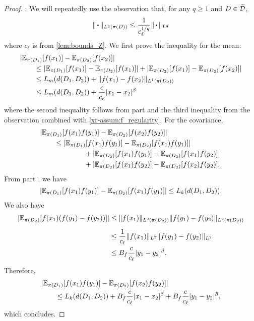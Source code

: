 \documentclass[12pt, twoside]{report}
\newcommand{\xrprefix}[1]{xr-#1}
\begin{document}
\begin{proof}
    :
    We will repeatedly use the observation that, for any $q \ge 1$ and $D \in \widetilde{\mathcal{D}}$,
    \begin{equation}
        \norm{\vardot}_{L^q(\pi(D))} \le \frac{1}{c_\ell^{1/q}} \norm{\vardot}_{L^q}
    \end{equation}
    where $c_\ell$ is from \cref{lem:bounds_Z}.
    We first prove the inequality for the mean:
    \begin{align}
        &\lvert\mathbb{E}_{\pi(D_1)}[f(x_1)] - \mathbb{E}_{\pi(D_2)}[f(x_2)]\rvert \nonumber \\
        &\qquad\le
            \lvert\mathbb{E}_{\pi(D_1)}[f(x_1)] - \mathbb{E}_{\pi(D_2)}[f(x_1)]\rvert
            + \lvert\mathbb{E}_{\pi(D_2)}[f(x_1)] - \mathbb{E}_{\pi(D_2)}[f(x_2)]\rvert \\
        &\qquad\le
            L_m(d(D_1, D_2))
            + \lVert f(x_1) - f(x_2)\rVert_{L^1(\pi(D_2))} \\
        &\qquad\le
            L_m(d(D_1, D_2))
            + \frac{c}{c_\ell} \lvert x_1 - x_2\rvert^\beta
    \end{align}
    where the second inequality follows from part  and the third inequality from the observation combined with \cref{\xrprefix{assum:f_regularity}}.
    For the covariance,
    \begin{align}
        &\lvert\mathbb{E}_{\pi(D_1)}[f(x_1)f(y_1)] - \mathbb{E}_{\pi(D_2)}[f(x_2)f(y_2)]\rvert \nonumber \\
        &\qquad\le
            \lvert\mathbb{E}_{\pi(D_1)}[f(x_1)f(y_1)] - \mathbb{E}_{\pi(D_2)}[f(x_1)f(y_1)]\rvert \nonumber \\
        &\qquad\;\qquad\qquad
            + \lvert\mathbb{E}_{\pi(D_2)}[f(x_1)f(y_1)] - \mathbb{E}_{\pi(D_2)}[f(x_1)f(y_2)]\rvert \nonumber \\
        &\qquad\;\qquad\qquad
            + \lvert\mathbb{E}_{\pi(D_2)}[f(x_1)f(y_2)] - \mathbb{E}_{\pi(D_2)}[f(x_2)f(y_2)]\rvert.
    \end{align}
    From part , we have
    \begin{equation}
        \lvert\mathbb{E}_{\pi(D_1)}[f(x_1)f(y_1)] - \mathbb{E}_{\pi(D_2)}[f(x_1)f(y_1)]\rvert
        \le L_k(d(D_1, D_2)).
    \end{equation}
    We also have
    \begin{align}
        \abs{\E_{\pi(D_2)}[f(x_1)(f(y_1) - f(y_2))]}
        &\le \vphantom{\frac{}{c_\ell}}\norm{f(x_1)}_{L^2(\pi(D_2))}\norm{f(y_1) - f(y_2)}_{L^2(\pi(D_2))} \\
        &\le \vphantom{\frac{B_f}{}}\frac1{c_\ell}
            \norm{f(x_1)}_{L^2} \norm{f(y_1) - f(y_2)}_{L^2} \\
        &\le B_f \frac{c}{c_\ell}
            \abs{y_1 - y_2}^\beta.
    \end{align}
    Therefore,
    \begin{align}
        &\lvert\mathbb{E}_{\pi(D_1)}[f(x_1)f(y_1)] - \mathbb{E}_{\pi(D_2)}[f(x_2)f(y_2)]\rvert \nonumber \\
        &\qquad\le
            L_k(d(D_1, D_2))
            + B_f \frac{c}{c_\ell} \lvert x_1 - x_2\rvert^\beta
            + B_f \frac{c}{c_\ell} \lvert y_1 - y_2\rvert^\beta,
    \end{align}
    which concludes.
\end{proof}
\end{document}
